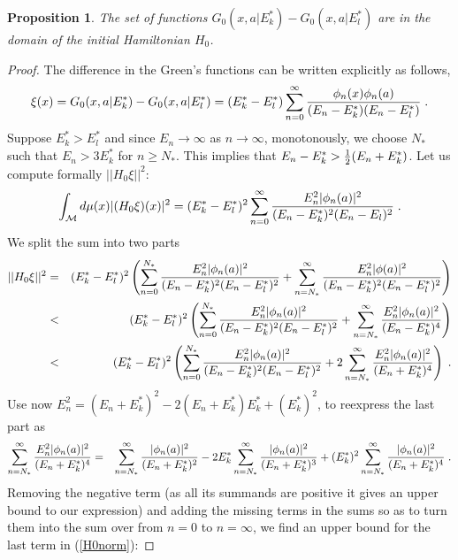 \documentclass[amsmath,amssymb,14pt]{article}
\numberwithin{equation}{section}
\newtheorem{myproposition}[mytheo]{Proposition}
\begin{document}
\begin{myproposition} The set of functions $G_0(x, a|E_k^*)-G_0(x,a|E_l^*)$ are in the domain of the initial Hamiltonian $H_0$.
\end{myproposition}

\begin{proof}
The difference in the Green's functions can be written explicitly as follows,
%
\begin{eqnarray}
   \xi(x)=G_0(x, a|E_k^*)-G_0(x,a|E_l^*)=(E_k^*-E_l^*)\sum_{n=0}^\infty {\phi_n(x)\phi_n(a)\over (E_n-E_k^*)(E_n-E_l^*)} \;.
\end{eqnarray}
%
Suppose $E_k^*>E_l^*$ and since $E_n\to \infty$ as $n\to \infty$, monotonously, we choose $N_*$ such that $E_n> 3E_k^*$ for $n\geq N_*$. This implies that 
$E_n-E_k^*> {1\over 2} (E_n+E_k^*)$. 
Let us compute formally
$ ||H_0 \xi||^2$:
\begin{equation}
    \int_{\mathcal M} d\mu(x) | (H_0\xi)(x)|^2= (E_k^*-E_l^*)^2 \sum_{n=0}^\infty { E_n^2 |\phi_n(a)|^2\over (E_n-E_k^*)^2(E_n-E_l)^2}
\; .\end{equation}
We split the sum into two parts
\begin{eqnarray}
||H_0\xi||^2&=& (E_k^*-E_l^*)^2 \left(\sum_{n=0}^{N_*} {E_n^2|\phi_n(a)|^2\over (E_n-E_k^*)^2(E_n-E_l^*)^2}+\sum_{n={N_*}}^\infty {E_n^2 |\phi(a)|^2\over (E_n-E_k^*)^2(E_n-E_l^*)^2} \right) \nonumber\\
        &<& (E_k^*-E_l^*)^2 \left( \sum_{n=0}^{N_*} {E_n^2|\phi_n(a)|^2\over (E_n-E_k^*)^2(E_n-E_l^*)^2}+\sum_{n={N_*}}^\infty {E_n^2 |\phi_n(a)|^2\over (E_n-E_k^*)^4} \right) \nonumber \\
        &<& (E_k^*-E_l^*)^2 \left( \sum_{n=0}^{N_*} {E_n^2|\phi_n(a)|^2\over (E_n-E_k^*)^2(E_n-E_l^*)^2}+2\sum_{n={N_*}}^\infty {E_n^2 |\phi_n(a)|^2\over (E_n+E_k^*)^4} \right) \;.      \label{H0norm}
\end{eqnarray}
%
Use now $E_n^2=(E_n+E_k^*)^2-2(E_n+E_k^*) E_{k}^{*}+(E_k^*)^2$, to reexpress the last part as
%
\begin{eqnarray}
    \sum_{n={N_*}}^\infty {E_n^2 |\phi_n(a)|^2\over (E_n+E_k^*)^4}&=&\sum_{n={N_*}}^\infty { |\phi_n(a)|^2\over (E_n+E_k^*)^2}-2 E_{k}^{*}\sum_{n={N_*}}^\infty { |\phi_n(a)|^2\over (E_n+E_k^*)^3}
+(E_k^*)^2\sum_{n={N_*}}^\infty { |\phi_n(a)|^2\over (E_n+E_k^*)^4} \;.
\end{eqnarray}
%
Removing the negative term (as all its summands are positive it gives an upper bound to our expression) and adding the missing terms in the sums so as to turn them into the sum over from $n=0$ to $n=\infty$, we find an upper bound for the last term in (\ref{H0norm}): 

\end{proof}
\end{document}
